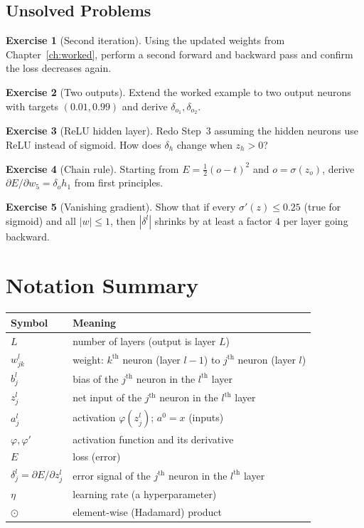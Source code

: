 \documentclass[11pt,a4paper]{report}
\theoremstyle{definition}
\newtheorem{exercise}{Exercise}[chapter]
\theoremstyle{remark}
\begin{document}
\section{Unsolved Problems}
\begin{exercise}[Second iteration]
Using the updated weights from Chapter~\ref{ch:worked}, perform a second forward
and backward pass and confirm the loss decreases again.
\end{exercise}
\begin{exercise}[Two outputs]
Extend the worked example to two output neurons with targets $(0.01,0.99)$ and
derive $\delta_{o_1},\delta_{o_2}$.
\end{exercise}
\begin{exercise}[ReLU hidden layer]
Redo Step~3 assuming the hidden neurons use ReLU instead of sigmoid. How does
$\delta_h$ change when $z_h>0$?
\end{exercise}
\begin{exercise}[Chain rule]
Starting from $E=\tfrac12(o-t)^2$ and $o=\sigma(z_o)$, derive
$\partial E/\partial w_5=\delta_o h_1$ from first principles.
\end{exercise}
\begin{exercise}[Vanishing gradient]
Show that if every $\sigma'(z)\le 0.25$ (true for sigmoid) and all $|w|\le 1$,
then $|\delta^{l}|$ shrinks by at least a factor $4$ per layer going backward.
\end{exercise}

\appendix
\chapter{Notation Summary}
\begin{center}
\begin{tabular}{@{}ll@{}}
\toprule
Symbol & Meaning\\
\midrule
$L$ & number of layers (output is layer $L$)\\
$w^{l}_{jk}$ & weight: $k^{\text{th}}$ neuron (layer $l-1$) to $j^{\text{th}}$ neuron (layer $l$)\\
$b^{l}_{j}$ & bias of the $j^{\text{th}}$ neuron in the $l^{\text{th}}$ layer\\
$z^{l}_{j}$ & net input of the $j^{\text{th}}$ neuron in the $l^{\text{th}}$ layer\\
$a^{l}_{j}$ & activation $\varphi(z^{l}_{j})$; $a^{0}=x$ (inputs)\\
$\varphi,\varphi'$ & activation function and its derivative\\
$E$ & loss (error)\\
$\delta^{l}_{j}=\partial E/\partial z^{l}_{j}$ & error signal of the $j^{\text{th}}$ neuron in the $l^{\text{th}}$ layer\\
$\eta$ & learning rate (a hyperparameter)\\
$\odot$ & element-wise (Hadamard) product\\
\bottomrule
\end{tabular}
\end{center}
\end{document}

